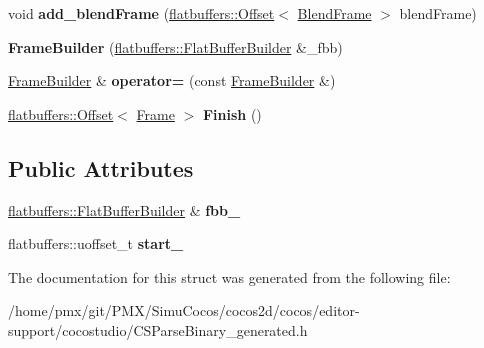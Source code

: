 \begin{DoxyCompactItemize}
\item 
\mbox{\label{structflatbuffers_1_1FrameBuilder_a811300c49444ee73e33c4190139c139a}} 
void {\bfseries add\+\_\+blend\+Frame} (\hyperlink{structflatbuffers_1_1Offset}{flatbuffers\+::\+Offset}$<$ \hyperlink{structflatbuffers_1_1BlendFrame}{Blend\+Frame} $>$ blend\+Frame)
\item 
\mbox{\label{structflatbuffers_1_1FrameBuilder_ab617cdaf3a4c5586badbf0e6a63e2808}} 
{\bfseries Frame\+Builder} (\hyperlink{classflatbuffers_1_1FlatBufferBuilder}{flatbuffers\+::\+Flat\+Buffer\+Builder} \&\+\_\+fbb)
\item 
\mbox{\label{structflatbuffers_1_1FrameBuilder_ad17c97d77856e1eb1d7fbbd66615ec73}} 
\hyperlink{structflatbuffers_1_1FrameBuilder}{Frame\+Builder} \& {\bfseries operator=} (const \hyperlink{structflatbuffers_1_1FrameBuilder}{Frame\+Builder} \&)
\item 
\mbox{\label{structflatbuffers_1_1FrameBuilder_a03e14d2b7f067f84cea651d1a5c2e469}} 
\hyperlink{structflatbuffers_1_1Offset}{flatbuffers\+::\+Offset}$<$ \hyperlink{structflatbuffers_1_1Frame}{Frame} $>$ {\bfseries Finish} ()
\end{DoxyCompactItemize}
\subsection*{Public Attributes}
\begin{DoxyCompactItemize}
\item 
\mbox{\label{structflatbuffers_1_1FrameBuilder_ae4e1573f5aeec038f0a1983040e4c650}} 
\hyperlink{classflatbuffers_1_1FlatBufferBuilder}{flatbuffers\+::\+Flat\+Buffer\+Builder} \& {\bfseries fbb\+\_\+}
\item 
\mbox{\label{structflatbuffers_1_1FrameBuilder_a51505909dbb7597b336903c22e9831ae}} 
flatbuffers\+::uoffset\+\_\+t {\bfseries start\+\_\+}
\end{DoxyCompactItemize}


The documentation for this struct was generated from the following file\+:\begin{DoxyCompactItemize}
\item 
/home/pmx/git/\+P\+M\+X/\+Simu\+Cocos/cocos2d/cocos/editor-\/support/cocostudio/C\+S\+Parse\+Binary\+\_\+generated.\+h\end{DoxyCompactItemize}
